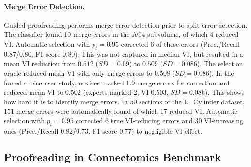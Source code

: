 \paragraph{Merge Error Detection.} Guided proofreading performs merge error detection prior to split error detection. The classifier found 10 merge errors in the AC4 subvolume, of which 4 reduced VI. Automatic selection with $p_t=0.95$ corrected 6 of these errors (Prec./Recall 0.87/0.80, F1-score 0.80). This was not captured in median VI, but resulted in a mean VI reduction from $0.512$ ($SD=0.09$) to $0.509$ ($SD=0.086$). The selection oracle reduced mean VI with only merge errors to $0.508$ ($SD=0.086$). In the forced choice user study, novices marked 1.9 merge errors for correction and reduced mean VI to $0.502$ (experts marked 2, VI $0.503$, $SD=0.086$). This shows how hard it is to identify merge errors. In 50 sections of the L.~Cylinder dataset, 151 merge errors were automatically found of which 17 reduced VI. Automatic selection with $p_t=0.95$ corrected 6 true VI-reducing errors and 30 VI-increasing ones (Prec./Recall 0.82/0.73, F1-score 0.77) to negligible VI effect. 

\subsection{Proofreading in Connectomics Benchmark}



